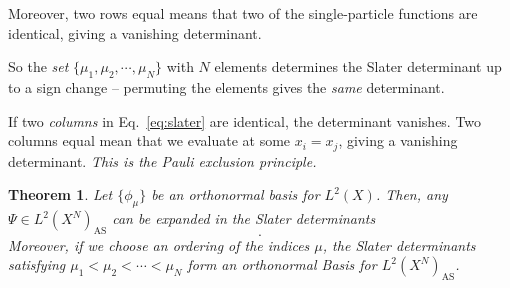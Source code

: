 \documentclass{report}
\theoremstyle{plain}
\newtheorem{theorem}{Theorem}[chapter]
\theoremstyle{definition}
\begin{document}
Moreover, two rows equal means that two of the
single-particle functions are identical, giving a vanishing
determinant.

So the \emph{set} $\{\mu_1,\mu_2,\cdots,\mu_N\}$ with $N$ elements determines the
Slater determinant up to a sign change -- permuting the elements gives the \emph{same}
determinant.

If two \emph{columns} in Eq.~\eqref{eq:slater} are identical, the
determinant vanishes. Two columns equal mean that we evaluate at some
$x_i = x_j$, giving a vanishing determinant. \emph{This is the Pauli
  exclusion principle.} 

\begin{theorem}
  Let $\{\phi_\mu\}$ be an orthonormal basis for
  $L^2(X)$. Then, any $\Psi \in L^2(X^N)_\text{AS}$ can be expanded in
  the Slater determinants
  \begin{equation}
    [\phi_{\mu_1},\phi_{\mu_2},\cdots,\phi_{\mu_N}].
  \end{equation}
  Moreover, if we choose an ordering of the indices $\mu$, the Slater
  determinants satisfying $\mu_1<\mu_2<\cdots<\mu_N$ form an
  orthonormal Basis for $L^2(X^N)_\text{AS}$.
\end{theorem}
\end{document}
